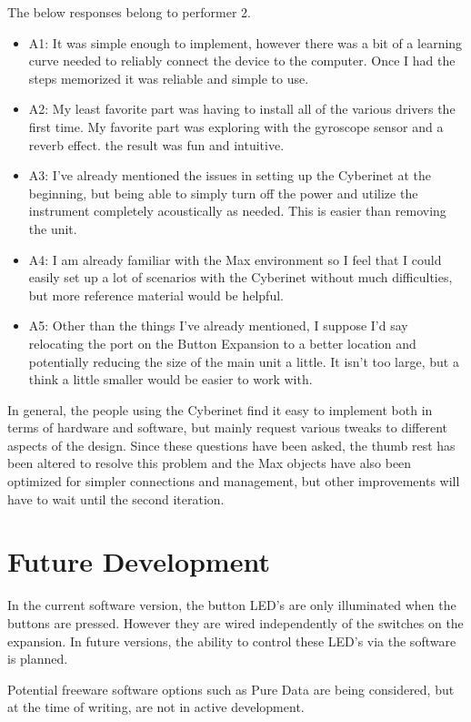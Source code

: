 The below responses belong to performer 2. %

\begin{itemize}
    \item A1: It was simple enough to implement, however there was a bit of a learning curve needed to reliably connect the device to the computer. Once I had the steps memorized it was reliable and simple to use.
    \item A2: My least favorite part was having to install all of the various drivers the first time. My favorite part was exploring with the gyroscope sensor and a reverb effect. the result was fun and intuitive.
    \item A3: I've already mentioned the issues in setting up the Cyberinet at the beginning, but being able to simply turn off the power and utilize the instrument completely acoustically as needed. This is easier than removing the unit.
    \item A4: I am already familiar with the Max environment so I feel that I could easily set up a lot of scenarios with the Cyberinet without much difficulties, but more reference material would be helpful. 
    \item A5: Other than the things I've already mentioned, I suppose I'd say relocating the port on the Button Expansion to a better location and potentially reducing the size of the main unit a little. It isn't too large, but a think a little smaller would be easier to work with.
\end{itemize}

In general, the people using the Cyberinet find it easy to implement both in terms of hardware and software, but mainly request various tweaks to different aspects of the design. Since these questions have been asked, the thumb rest has been altered to resolve this problem and the Max objects have also been optimized for simpler connections and management, but other improvements will have to wait until the second iteration.

\section{Future Development}

In the current software version, the button LED's are only illuminated when the buttons are pressed. However they are wired independently of the switches on the expansion. In future versions, the ability to control these LED's via the software is planned.


Potential freeware software options such as Pure Data are being considered, but at the time of writing, are not in active development.

